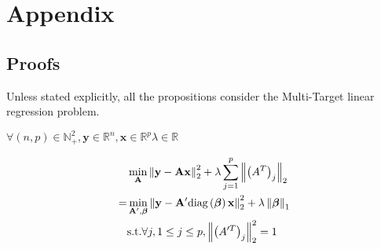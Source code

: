 \section{Appendix}

%

\subsection{Proofs}
Unless stated explicitly, all the propositions consider the Multi-Target linear regression problem.
\begin{proposition}
\label{gps_equivalence}
  $\forall (n, p) \in \mathbb{N}_+^2, \bm{y} \in \mathbb{R}^{n}, \bm{x} \in \mathbb{R}^{p} \lambda \in \mathbb{R}$
  
  \begin{align*}
    & \min_{\bf{A}} \left\lVert\bf{y} - \bf{A}\bf{x}\right\rVert_2^2 + \lambda \sum_{j=1}^p \left\lVert\left(A^T\right)_j\right\rVert_2 \\
     = &\min_{\bf{A'}, \bm{\beta}} \left\lVert\bf{y} - \bf{A'}\text{diag}\left(\bm{\beta}\right)\bf{x}\right\rVert_2^2 + \lambda \left\lVert\bm{\beta}\right\rVert_1 \\
     & \text{s.t.} \forall j, 1 \leq j \leq p, \left\lVert\left(A'^T\right)_j\right\rVert_2^2 = 1
  \end{align*}
\end{proposition}

